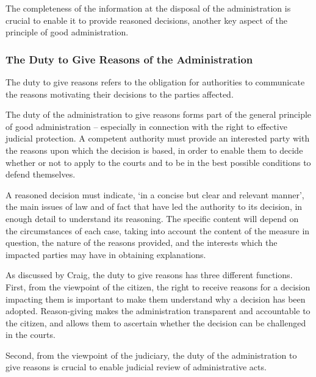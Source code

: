 The completeness of the information at the disposal of the administration is crucial to enable it to provide reasoned decisions, another key aspect of the principle of good administration.

\subsubsection{The Duty to Give Reasons of the Administration}
\label{sec:ch2-duty-to-give-reasons}

The duty to give reasons refers to the obligation for authorities to communicate the reasons motivating their decisions to the parties affected.\autocite[38]{mustertCrossborderEnforcementGDPR} 

The duty of the administration to give reasons forms part of the general principle of good administration -- especially in connection with the right to effective judicial protection.\autocites[34]{MinBZ}[57]{piVLandespolizeidirektion}
A competent authority must provide an interested party with the reasons upon which the decision is based, in order to enable them to decide whether or not to apply to the courts and to be in the best possible conditions to defend themselves.\autocite[63]{Penarroja}

A reasoned decision must indicate, `in a concise but clear and relevant manner', the main issues of law and of fact that have led the authority to its decision, in enough detail to understand its reasoning.\autocite[page 69]{GermanyvComm}
The specific content will depend on the circumstances of each case, taking into account the content of the measure in question, the nature of the reasons provided, and the interests which the impacted parties may have in obtaining explanations.\autocite[63]{Sytraval}

As discussed by Craig, the duty to give reasons has three different functions.
First, from the viewpoint of the citizen, the right to receive reasons for a decision impacting them is important to make them understand why a decision has been adopted.\autocite[369]{craigProcess2018}
Reason-giving makes the administration transparent and accountable to the citizen, and allows them to ascertain whether the decision can be challenged in the courts.\autocite[38]{mustertCrossborderEnforcementGDPR}

Second, from the viewpoint of the judiciary, the duty of the administration to give reasons is crucial to enable judicial review of administrative acts.\autocite[370]{craigProcess2018}

